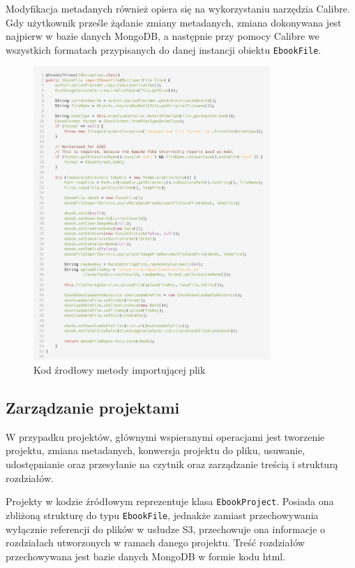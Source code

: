 Modyfikacja metadanych również opiera się na wykorzystaniu narzędzia Calibre. Gdy użytkownik prześle żądanie zmiany metadanych, zmiana dokonywana jest najpierw w bazie danych MongoDB, a następnie przy pomocy Calibre we wszystkich formatach przypisanych do danej instancji obiektu \verb|EbookFile|.

\begin{figure}[h]
    \centering
    \setlength{\fboxsep}{0pt}
    \setlength{\fboxrule}{0.4pt}
    \includegraphics[width=0.8\textwidth]{chap5/import-file-listing.png}
    \caption{Kod źrodłowy metody importującej plik}
    \label{listing:import_file_method}
\end{figure}

\subsection{Zarządzanie projektami}

W przypadku projektów, głównymi wspieranymi operacjami jest tworzenie projektu, zmiana metadanych, konwersja projektu do pliku, usuwanie, udostępnianie oraz przesyłanie na czytnik oraz zarządzanie treścią i strukturą rozdziałów.

Projekty w kodzie źródłowym reprezentuje klasa \verb|EbookProject|. Posiada ona zbliżoną strukturę do typu \verb|EbookFile|, jednakże zamiast przechowywania wyłącznie referencji do plików w usłudze S3, przechowuje ona informacje o rozdziałach utworzonych w ramach danego projektu. Treść rozdziałów przechowywana jest bazie danych MongoDB w formie kodu html.


